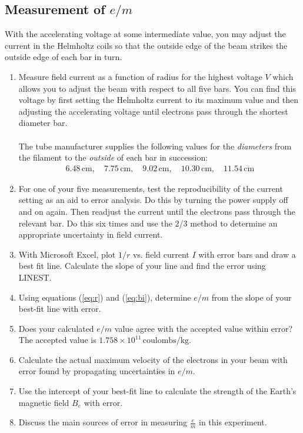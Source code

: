 \subsection{Measurement of $e/m$}
With the accelerating voltage at some intermediate value, you may adjust the current in the Helmholtz coils so that the outside edge of the beam strikes the outside edge of each bar in turn.
\begin{enumerate}
  \item Measure field current as a function of radius for the highest voltage $V$ which allows you to adjust the beam with respect to all five bars. You can find this voltage by first setting the Helmholtz current to its maximum value and then adjusting the accelerating voltage until electrons pass through the shortest diameter bar.\\ \\

  The tube manufacturer supplies the following values for the \emph{diameters} from the filament to the \emph{outside} of each bar in succession:
  \begin{gather*}
  6.48\,\textrm{cm},\quad 7.75\,\textrm{cm},\quad 9.02\,\textrm{cm},\quad 10.30\,\textrm{cm},\quad 11.54\,\textrm{cm}
  \end{gather*}

  \item For one of your five measurements, test the reproducibility of the current setting as an aid to error analysis. Do this by turning the power supply off and on again. Then readjust the current until the electrons pass through the relevant bar. Do this six times and use the 2/3 method to determine an appropriate uncertainty in field current.

  \item With Microsoft Excel, plot $1/r$ vs. field current $I$ with error bars and draw a best fit line. Calculate the slope of your line and find the error using LINEST.

  \item Using equations ({\ref{eq:r}}) and ({\ref{eq:bi}}), determine $e/m$ from the slope of your best-fit line with error.

  \item Does your calculated $e/m$ value agree with the accepted value within error? The accepted value is $1.758 \times 10^{11}\, \mathrm{coulombs} / \mathrm{kg}$.

  \item Calculate the actual maximum velocity of the electrons in your beam with error found by propagating uncertainties in $e/m$.

  \item Use the intercept of your best-fit line to calculate the strength of the Earth's magnetic field $B_e$ with error.

  \item Discuss the main sources of error in measuring $\frac{e}{m}$ in this experiment.
\end{enumerate}
